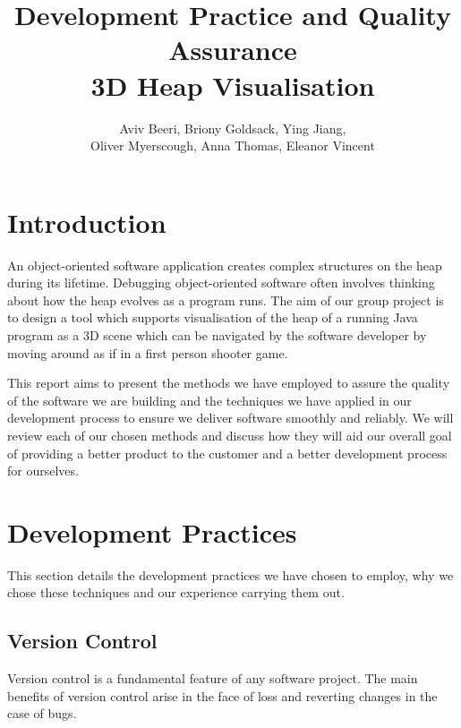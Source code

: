\documentclass[10pt, a4paper]{article}
\begin{document}
\title{Development Practice and Quality Assurance
\\ 3D Heap Visualisation}
\author{Aviv Beeri, Briony Goldsack, Ying Jiang, 
\\ Oliver Myerscough, Anna Thomas, Eleanor Vincent}
\maketitle

\section{Introduction}

An object-oriented software application creates complex structures on the heap during its lifetime. Debugging object-oriented software often involves thinking about how the heap evolves as a program runs. The aim of our group project is to design a tool which supports visualisation of the heap of a running Java program as a 3D scene which can be navigated by the software developer by moving around as if in a first person shooter game.

This report aims to present the methods we have employed to assure the quality of the software we are building and the techniques we have applied in our development process to ensure we deliver software smoothly and reliably. We will review each of our chosen methods and discuss how they will aid our overall goal of providing a better product to the customer and a better development process for ourselves. 

\section{Development Practices}

This section details the development practices we have chosen to employ, why we chose these techniques and our experience carrying them out. 

\subsection{Version Control}

Version control is a fundamental feature of any software project. The main benefits of version  control arise in the face of loss and reverting changes in the case of bugs.
\end{document}
